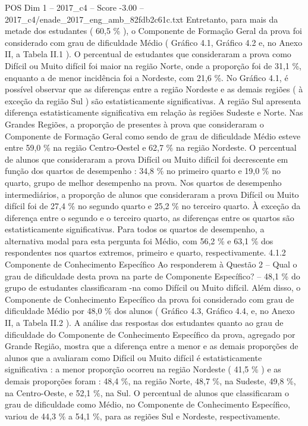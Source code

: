 \begin{textsample}{POS Dim 1 – 2017\_c4 – Score -3.00 – 2017\_c4/enade\_2017\_eng\_amb\_82fdb2c61c.txt}
Entretanto, para mais da metade dos estudantes ( 60,5 \% ), o Componente de Formação Geral da prova foi considerado com grau de dificuldade Médio ( Gráfico 4.1, Gráfico 4.2 e, no Anexo II, a Tabela II.1 ).
O percentual de estudantes que consideraram a prova como Difícil ou Muito difícil foi maior na região Norte, onde a proporção foi de 31,1 \%, enquanto a de menor incidência foi a Nordeste, com 21,6 \%.
No Gráfico 4.1, é possível observar que as diferenças entre a região Nordeste e as demais regiões ( à exceção da região Sul ) são estatisticamente significativas.
A região Sul apresenta diferença estatisticamente significativa em relação às regiões Sudeste e Norte.
Nas Grandes Regiões, a proporção de presentes à prova que consideraram o Componente de Formação Geral como sendo de grau de dificuldade Médio esteve entre 59,0 \% na região Centro-Oestel e 62,7 \% na região Nordeste.
O percentual de alunos que consideraram a prova Difícil ou Muito difícil foi decrescente em função dos quartos de desempenho : 34,8 \% no primeiro quarto e 19,0 \% no quarto, grupo de melhor desempenho na prova.
Nos quartos de desempenho intermediários, a proporção de alunos que consideraram a prova Difícil ou Muito difícil foi de 27,4 \% no segundo quarto e 25,2 \% no terceiro quarto.
À exceção da diferença entre o segundo e o terceiro quarto, as diferenças entre os quartos são estatisticamente significativas.
Para todos os quartos de desempenho, a alternativa modal para esta pergunta foi Médio, com 56,2 \% e 63,1 \% dos respondentes nos quartos extremos, primeiro e quarto, respectivamente. 4.1.2 Componente de Conhecimento Específico Ao responderem à Questão 2 – Qual o grau de dificuldade desta prova na parte de Componente Específico? – 48,1 \% do grupo de estudantes classificaram -na como Difícil ou Muito difícil.
Além disso, o Componente de Conhecimento Específico da prova foi considerado com grau de dificuldade Médio por 48,0 \% dos alunos ( Gráfico 4.3, Gráfico 4.4, e, no Anexo II, a Tabela II.2 ).
A análise das respostas dos estudantes quanto ao grau de dificuldade do Componente de Conhecimento Específico da prova, agregado por Grande Região, mostra que a diferença entre a menor e as demais proporções de alunos que a avaliaram como Difícil ou Muito difícil é estatisticamente significativa : a menor proporção ocorreu na região Nordeste ( 41,5 \% ) e as demais proporções foram : 48,4 \%, na região Norte, 48,7 \%, na Sudeste, 49,8 \%, na Centro-Oeste, e 52,1 \%, na Sul.
O percentual de alunos que classificaram o grau de dificuldade como Médio, no Componente de Conhecimento Específico, variou de 44,3 \% a 54,1 \%, para as regiões Sul e Nordeste, respectivamente.

\end{textsample}
